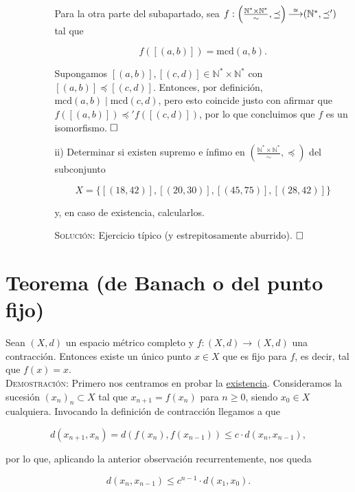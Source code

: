 \documentclass{article}
\begin{document}
\begin{enumerate}
\begin{enumerate}
\begin{enumerate}
            Para la otra parte del subapartado, sea $f : \left(\frac{\mathbb{N}^* \times \mathbb{N}^*}{\sim}, \preceq\right) \accentset{\cong}{\longrightarrow} (\mathbb{N}^*, \preceq')$ tal que

            \[f([(a, b)]) = \text{mcd}(a, b).\]

            Supongamos $[(a, b)], [(c, d)] \in \mathbb{N}^* \times \mathbb{N}^*$ con $[(a, b)] \preceq [(c, d)]$. Entonces, por definición, $\text{mcd}(a, b) \mid \text{mcd}(c, d)$, pero esto coincide justo con afirmar que $f([(a, b)]) \preceq' f([(c, d)])$, por lo que concluimos que $f$ es un isomorfismo. $\hfill\square$

            \item[ii)] Determinar si existen supremo e ínfimo en $\left(\frac{\mathbb{N}^* \times \mathbb{N}^*}{\sim}, \preceq\right)$ del subconjunto 

            \[X = \{[(18, 42)], [(20, 30)], [(45, 75)], [(28, 42)]\}\]

            y, en caso de existencia, calcularlos.

            \textsc{Solución}: Ejercicio típico (y estrepitosamente aburrido). $\hfill\square$
        \end{enumerate}
    \end{enumerate}
\end{enumerate}

\newpage

\section{Teorema (de Banach o del punto fijo)}

Sean $(X, d)$ un espacio métrico completo y $f : (X, d) \longrightarrow (X, d)$ una contracción. Entonces existe un único punto $x \in X$ que es fijo para $f$, es decir, tal que $f(x) = x$. \\

\noindent\textsc{Demostración:} Primero nos centramos en probar la \underline{existencia}. Consideramos la sucesión $(x_n)_n \subset X$ tal que $x_{n + 1} = f(x_n)$ para $n \geq 0$, siendo $x_0 \in X$ cualquiera. Invocando la definición de contracción llegamos a que

\[d(x_{n+1}, x_n) = d(f(x_n), f(x_{n - 1})) \leq c \cdot d(x_n, x_{n - 1}),\]

\noindent por lo que, aplicando la anterior observación recurrentemente, nos queda

\[d(x_n, x_{n-1}) \leq c^{n-1}\cdot d(x_1, x_0).\]
\end{document}
